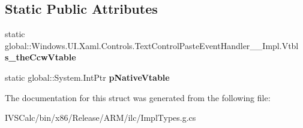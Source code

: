 \subsection*{Static Public Attributes}
\begin{DoxyCompactItemize}
\item 
\mbox{\label{struct_windows_1_1_u_i_1_1_xaml_1_1_controls_1_1_text_control_paste_event_handler_____impl_1_1_vtbl_a89cd7f0722a867c7c401fb43eed377a8}} 
static global\+::\+Windows.\+U\+I.\+Xaml.\+Controls.\+Text\+Control\+Paste\+Event\+Handler\+\_\+\+\_\+\+Impl.\+Vtbl {\bfseries s\+\_\+the\+Ccw\+Vtable}
\item 
\mbox{\label{struct_windows_1_1_u_i_1_1_xaml_1_1_controls_1_1_text_control_paste_event_handler_____impl_1_1_vtbl_ad93e20800ac8e1b2ca3b135848ef57d4}} 
static global\+::\+System.\+Int\+Ptr {\bfseries p\+Native\+Vtable}
\end{DoxyCompactItemize}


The documentation for this struct was generated from the following file\+:\begin{DoxyCompactItemize}
\item 
I\+V\+S\+Calc/bin/x86/\+Release/\+A\+R\+M/ilc/Impl\+Types.\+g.\+cs\end{DoxyCompactItemize}
